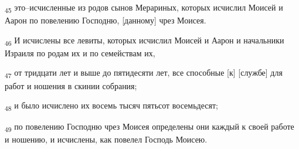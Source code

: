 \begin{tcolorbox}
\textsubscript{45} это--исчисленные из родов сынов Мерариных, которых исчислил Моисей и Аарон по повелению Господню, [данному] чрез Моисея.
\end{tcolorbox}
\begin{tcolorbox}
\textsubscript{46} И исчислены все левиты, которых исчислил Моисей и Аарон и начальники Израиля по родам их и по семействам их,
\end{tcolorbox}
\begin{tcolorbox}
\textsubscript{47} от тридцати лет и выше до пятидесяти лет, все способные [к] [службе] для работ и ношения в скинии собрания;
\end{tcolorbox}
\begin{tcolorbox}
\textsubscript{48} и было исчислено их восемь тысяч пятьсот восемьдесят;
\end{tcolorbox}
\begin{tcolorbox}
\textsubscript{49} по повелению Господню чрез Моисея определены они каждый к своей работе и ношению, и исчислены, как повелел Господь Моисею.
\end{tcolorbox}
